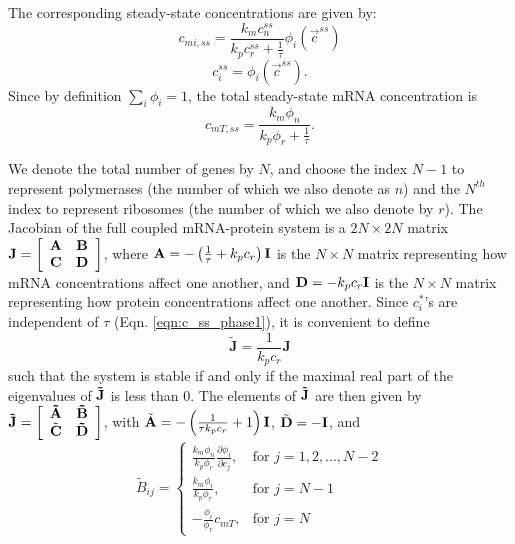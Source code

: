 \documentclass[10pt]{article}
\begin{document}
The corresponding steady-state concentrations are given by:
\begin{equation}
    c_{mi,ss} = \frac{k_m c_n^{ss}}{k_p c_r^{ss} + \frac{1}{\tau}} \phi_i(\vec{c}^{ss})
    \label{eqn:cm_ss}
\end{equation}
\begin{equation}
    c_i^{ss} = \phi_i(\vec{c}^{ss}). 
    \label{eqn:c_ss_phase1}
\end{equation}
Since by definition $\sum_i \phi_i = 1$, the total steady-state mRNA concentration is
\begin{equation}
    c_{mT,ss} = \frac{k_m \phi_n}{k_p \phi_r + \frac{1}{\tau}}. 
    \label{eqn:cmT}
\end{equation}

We denote the total number of genes by $N$, and choose the index $N-1$ to represent polymerases (the number of which we also denote as $n$) and the $N^{th}$ index to represent ribosomes (the number of which we also denote by $r$). The Jacobian of the full coupled mRNA-protein system is a $2N \times 2N$ matrix $\bf{J} = \left[\begin{array}{cc}
\bf{A} & \bf{B} \\
\bf{C} & \bf{D} \\
\end{array} \right]$, where $\textbf{A} = -\left(\frac{1}{\tau}+k_pc_r\right) \bf{I}$ is the $N \times N$ matrix representing how mRNA concentrations affect one another, and $\textbf{D} = -k_pc_r \bf{I}$ is the $N \times N$ matrix representing how protein concentrations affect one another. Since $c_i^*$'s are independent of $\tau$ (Eqn. \ref{eqn:c_ss_phase1}), it is convenient to define
\begin{equation}
    \mathbf{\tilde{J}} = \frac{1}{k_p c_r} \mathbf{J} 
    \label{eqnSI:Jtilde}
\end{equation}
such that the system is stable if and only if the maximal real part of the eigenvalues of $\bf{\tilde{J}}$ is less than 0. 
The elements of $\bf{\tilde{J}}$ are then given by $\bf{\tilde{J}} = \left[\begin{array}{cc}
\bf{\tilde{A}} & \bf{\tilde{B}} \\
\tilde{\bf{C}} & \bf{\tilde{D}} \\
\end{array} \right]$, with $\tilde{\textbf{A}} = -\left( \frac{1}{\tau k_p c_r}+1 \right) \bf{I}$, $\tilde{\bf{D}} = -\bf{I}$, and
\begin{equation}
    \tilde{B}_{ij} = \begin{cases}
    \frac{k_m \phi_n}{k_p \phi_r} \frac{\partial \phi_i}{\partial c_j}, & \text{for $j=1,2,...,N-2$} \\
    \frac{k_m \phi_i}{k_p \phi_r}, & \text{for $j=N-1$} \\
    -\frac{\phi_i}{\phi_r} c_{mT}, & \text{for $j=N$}
    \end{cases}
\end{equation}
\end{document}

